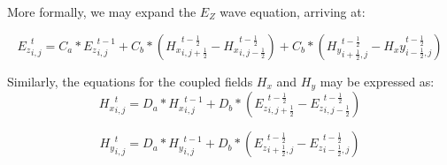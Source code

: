 More formally, we may expand the $E_Z$ wave equation, arriving at:

\begin{equation} \label{eq:ezupdate}
{E_z}_{i,j}^{t} = C_a * {E_z}_{i,j}^{t-1} 
+ C_b * ({H_x}_{i,j+\frac{1}{2}}^{t-\frac{1}{2}} - {H_x}_{i,j-\frac{1}{2}}^{t-\frac{1}{2}})
+ C_b * ({H_y}_{i+\frac{1}{2},j}^{t-\frac{1}{2}} - {H_xy}_{i-\frac{1}{2},j}^{t-\frac{1}{2}})
\end{equation}

Similarly, the equations for the coupled fields $H_x$ and $H_y$ may be expressed as:
\begin{equation} \label{eq:hxupdate}
{H_x}_{i,j}^t = D_a * {H_x}_{i,j}^{t-1} + D_b * (
{E_z}_{i,j+\frac{1}{2}}^{t-\frac{1}{2}} 
-
{E_z}_{i,j-\frac{1}{2}}^{t-\frac{1}{2}}
)  
\end{equation}

\begin{equation} \label{eq:hyupdate}
{H_y}_{i,j}^t = D_a * {H_y}_{i,j}^{t-1} + D_b * (
{E_z}_{i+\frac{1}{2},j}^{t-\frac{1}{2}} 
-
{E_z}_{i-\frac{1}{2},j}^{t-\frac{1}{2}}
)  
\end{equation}













